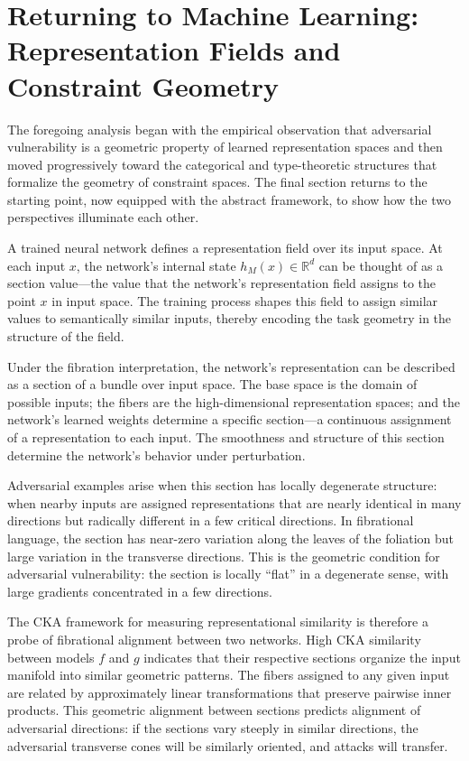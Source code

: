 \documentclass[12pt,a4paper]{article}
\theoremstyle{plain}
\theoremstyle{definition}
\begin{document}
\section{Returning to Machine Learning: Representation Fields and Constraint Geometry}

The foregoing analysis began with the empirical observation that adversarial vulnerability is a geometric property of learned representation spaces and then moved progressively toward the categorical and type-theoretic structures that formalize the geometry of constraint spaces. The final section returns to the starting point, now equipped with the abstract framework, to show how the two perspectives illuminate each other.

A trained neural network defines a representation field over its input space. At each input $x$, the network's internal state $h_M(x) \in \mathbb{R}^d$ can be thought of as a section value---the value that the network's representation field assigns to the point $x$ in input space. The training process shapes this field to assign similar values to semantically similar inputs, thereby encoding the task geometry in the structure of the field.

Under the fibration interpretation, the network's representation can be described as a section of a bundle over input space. The base space is the domain of possible inputs; the fibers are the high-dimensional representation spaces; and the network's learned weights determine a specific section---a continuous assignment of a representation to each input. The smoothness and structure of this section determine the network's behavior under perturbation.

Adversarial examples arise when this section has locally degenerate structure: when nearby inputs are assigned representations that are nearly identical in many directions but radically different in a few critical directions. In fibrational language, the section has near-zero variation along the leaves of the foliation but large variation in the transverse directions. This is the geometric condition for adversarial vulnerability: the section is locally ``flat'' in a degenerate sense, with large gradients concentrated in a few directions.

The CKA framework for measuring representational similarity is therefore a probe of fibrational alignment between two networks. High CKA similarity between models $f$ and $g$ indicates that their respective sections organize the input manifold into similar geometric patterns. The fibers assigned to any given input are related by approximately linear transformations that preserve pairwise inner products. This geometric alignment between sections predicts alignment of adversarial directions: if the sections vary steeply in similar directions, the adversarial transverse cones will be similarly oriented, and attacks will transfer.
\end{document}
